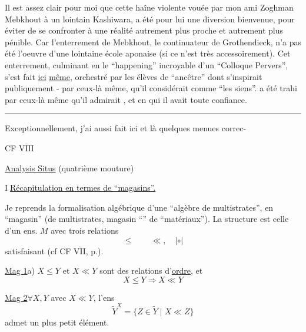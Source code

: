 Il est assez clair pour moi que cette haîne violente vouée par mon ami Zoghman Mebkhout à un lointain Kashiwara, a été pour lui une diversion bienvenue, pour éviter de se confronter à une réalité autrement plus proche et autrement plus pénible. Car l'enterrement de Mebkhout, le continuateur  de Grothendieck, n'a pas été l'oeuvre d'une lointaine école aponaise (si ce n'est très accessoirement). Cet enterrement, culminant en le ``happening'' incroyable d'un ``Colloque Pervers'', s'est fait \uline{ici} \uline{même},  orchestré par les élèves de  ``ancêtre'' dont   s'inspirait  publiquement - par ceux-là même,  qu'il considérait comme ``les siens''.   a été trahi par ceux-là même qu'il admirait , et en qui il avait toute confiance.

\noindent\rule{3cm}{0.4pt}

\handwritten{(*)} Exceptionnellement, j'ai aussi fait ici et là quelques menues correc-

CF \uline{$\overline{\mathrm{VIII}}$}

\uline{Analysis Situs} (quatrième mouture)


\textcircled{I}\quad\uline{Récapitulation en termes de ``magasins''.}

Je reprends la formalisation algébrique d'une ``algèbre de multistrates'', en ``magasin'' (de multistrates, magasin ``'' de ``matériaux''). La structure est celle d'un ens. $M$ avec trois relations
\[
\leq\qquad\ll,\quad|\circ|
\]
satisfaisant (cf CF \uline{$\overline{\mathrm{VII}}$}, p.).

\uline{Mag 1}\quad a) $X\leq Y$ et $X\ll Y$ sont des relations d'\uline{ordre}, et 
\[
X\leq Y\Longrightarrow X\ll Y
\]


\uline{Mag 2}\quad $\forall X,Y$ avec $X\ll Y$, l'ens
\[
\widetilde Y^X=\{Z\in\widetilde Y\mid X\ll Z\}
\]
admet un plus petit élément.


